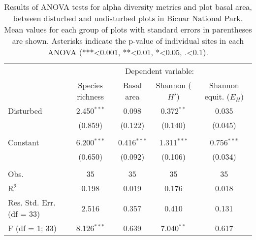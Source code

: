 \begin{table}[!htbp]
	\caption[ANOVA statistics among disturbed and undisturbed plots in Bicuar National Park]{Results of ANOVA tests for alpha diversity metrics and plot basal area, between disturbed and undisturbed plots in Bicuar National Park. Mean values for each group of plots with standard errors in parentheses are shown. Asterisks indicate the p-value of individual sites in each ANOVA (***<0.001, **<0.01, *<0.05, .<0.1).} 
	\label{bicuar:degrad_anova_table} 
\begin{tabular}{lcccc} 
\toprule
 & \multicolumn{4}{c}{Dependent variable:} \\ 
\cmidrule(lr){2-5} 
& Species richness & Basal area & Shannon ($H'$) & Shannon equit. ($E_{H}$) \\ 
\midrule
 Disturbed & 2.450$^{***}$ & 0.098 & 0.372$^{**}$ & 0.035 \\ 
  & (0.859) & (0.122) & (0.140) & (0.045) \\ 
  & & & & \\ 
 Constant & 6.200$^{***}$ & 0.416$^{***}$ & 1.311$^{***}$ & 0.756$^{***}$ \\ 
  & (0.650) & (0.092) & (0.106) & (0.034) \\ 
  & & & & \\ 
\midrule
Obs. & 35 & 35 & 35 & 35 \\ 
R$^{2}$ & 0.198 & 0.019 & 0.176 & 0.018 \\ 
Res. Std. Err. (df = 33) & 2.516 & 0.357 & 0.410 & 0.131 \\ 
F (df = 1; 33) & 8.126$^{***}$ & 0.639 & 7.040$^{**}$ & 0.617 \\ 
\bottomrule
\end{tabular} 
\end{table} 
